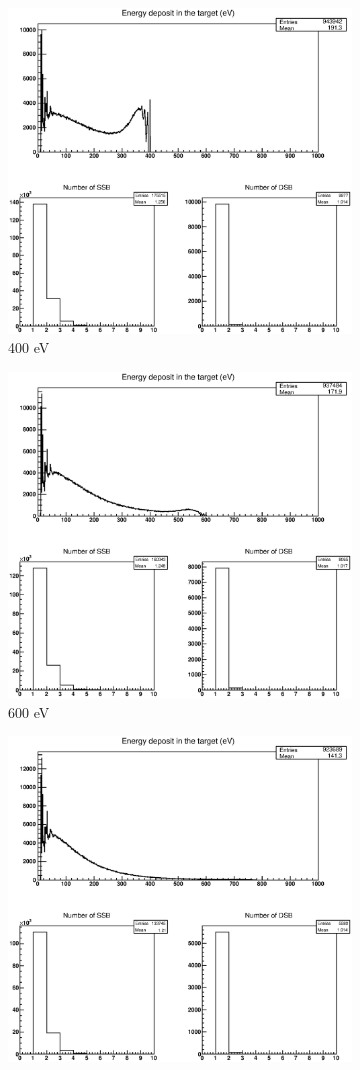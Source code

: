\begin{figure}
\begin{subfigure}{.5\textwidth}
  \includegraphics[width=.78\linewidth]{./Figures/1zbbe400ev.eps}
  \caption{400 eV}
  \label{fig:subei3}
\end{subfigure}%
\begin{subfigure}{.5\textwidth}
  \centering
  \includegraphics[width=.78\linewidth]{./Figures/1zbbe600ev.eps}
  \caption{600 eV}
  \label{fig:subei4}
\end{subfigure}
\begin{subfigure}{.5\textwidth}
  \centering
  \includegraphics[width=.78\linewidth]{./Figures/1zbbe800ev.eps}

\end{subfigure}
\end{figure}
